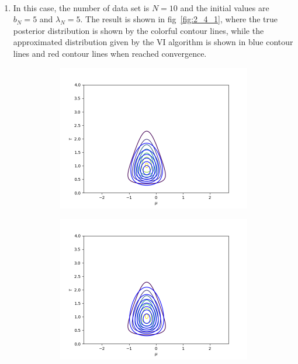 \documentclass[11pt]{extarticle}
\newcommand{\0}{\mathbf{0}}
\renewcommand{\(}{\left(}
\renewcommand{\)}{\right)}
\theoremstyle{definition}
\begin{document}
\noindent{} \\
\begin{enumerate}
	\item In this case, the number of data set is $N = 10$ and the initial values are $b_{N} = 5$ and $\lambda_{N} = 5$. The result is shown in fig~\ref{fig:2_4_1}, where the true posterior distribution is shown by the colorful contour lines, while the approximated distribution given by the VI algorithm is shown in blue contour lines and red contour lines when reached convergence.
	\begin{figure}[!ht]
		\centering
		\begin{subfigure}{.4\textwidth}
			\centering
			\includegraphics[width=\linewidth]{2_4_1_1}
		\end{subfigure}
		\begin{subfigure}{.4\textwidth}
			\centering
			\includegraphics[width=\linewidth]{2_4_1_2}

\end{subfigure}
\end{figure}
\end{enumerate}
\end{document}
